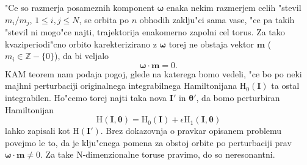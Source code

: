 \documentclass[]{article}
\begin{document}
\noindent "Ce so razmerja posameznih komponent $\boldsymbol{\omega}$ enaka nekim razmerjem celih "stevil $m_i/m_j$, $1\leq i,j\leq N$, se orbita po $n$ obhodih zaklju"ci sama vase, "ce pa takih "stevil ni mogo"ce najti, trajektorija enakomerno zapolni cel torus. Za tako kvaziperiodi"cno orbito karekterizirano z $\boldsymbol{\omega}$ torej ne obstaja vektor $\boldsymbol{m}$ ($m_i\in\mathbb{Z}-\{0\}$), da bi veljalo
\begin{equation}
\boldsymbol{\omega}\cdot\boldsymbol{m}=0.
\end{equation}
KAM teorem nam podaja pogoj, glede na katerega bomo vedeli, "ce bo po neki majhni perturbaciji originalnega integrabilnega Hamiltonijana $\text{H}_0(\boldsymbol{I})$ ta ostal integrabilen. Ho"cemo torej najti taka nova $\boldsymbol{I}'$ in $\boldsymbol{\theta}'$, da bomo perturbiran Hamiltonijan
\begin{equation}\label{5}
\text{H}(\boldsymbol{I},\boldsymbol{\theta})=\text{H}_0(\boldsymbol{I})+\epsilon\text{H}_1(\boldsymbol{I},\boldsymbol{\theta})
\end{equation}
lahko zapisali kot H$(\boldsymbol{I}')$. Brez dokazovnja o pravkar opisanem problemu povejmo le to, da je klju"cnega pomena za obstoj orbite po perturbaciji prav $\boldsymbol{\omega}\cdot\boldsymbol{m}\neq 0$. Za take N-dimenzionalne toruse pravimo, do so neresonantni.\newline
\end{document}
